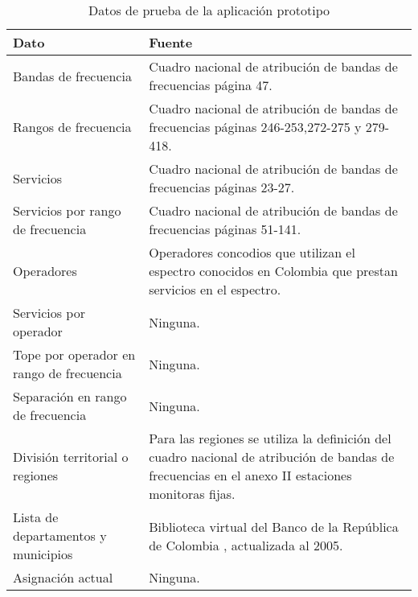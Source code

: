 \begin{center}
\begin{longtable}{|p{7cm}|p{9.5cm}|}
	\caption{Datos de prueba de la aplicación prototipo} \label{dataPrueba} \\
	\hline
	\cellcolor[gray]{0.9} \textbf{Dato} & \cellcolor[gray]{0.9}\textbf{Fuente} \\
	\hline
	Bandas de frecuencia & Cuadro nacional de atribución de bandas de frecuencias página 47.\\
	\hline
	Rangos de frecuencia & Cuadro nacional de atribución de bandas de frecuencias páginas 246-253,272-275 y 279-418.\\
	\hline
	Servicios & Cuadro nacional de atribución de bandas de frecuencias páginas 23-27.\\
	\hline
	Servicios por rango de frecuencia & Cuadro nacional de atribución de bandas de frecuencias páginas 51-141.\\
	\hline
	Operadores & Operadores concodios que utilizan el espectro conocidos en Colombia que prestan servicios en el espectro.\\
	\hline
	Servicios por operador & Ninguna.\\
	\hline
	Tope por operador en rango de frecuencia & Ninguna.\\
	\hline
	Separación en rango de frecuencia & Ninguna.\\
	\hline
	División territorial o regiones & Para las regiones se utiliza la definición del cuadro nacional de atribución de bandas de frecuencias en el anexo II estaciones monitoras fijas.\\
	\hline
	Lista de departamentos y municipios & Biblioteca virtual del Banco de la República de Colombia \cite{ListMunDep}, actualizada al 2005. \\
	\hline
	Asignación actual & Ninguna. \\
	\hline
\end{longtable}	
\end{center}

